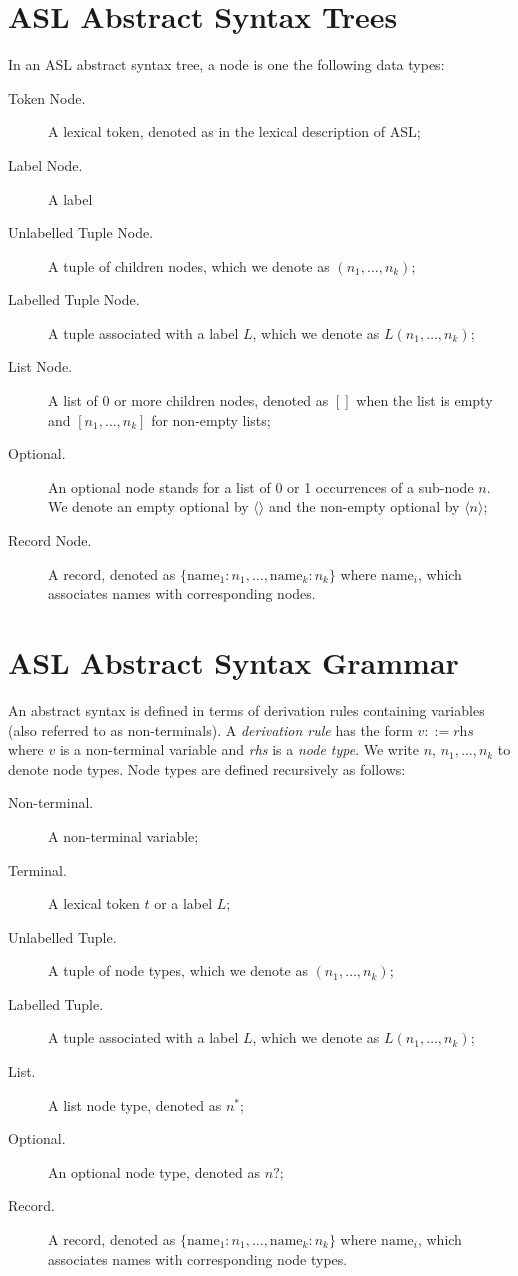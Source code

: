 \documentclass{book}
\begin{document}
\section{ASL Abstract Syntax Trees}

In an ASL abstract syntax tree, a node is one the following data types:
\begin{description}
\item[Token Node.] A lexical token, denoted as in the lexical description of ASL;
\item[Label Node.] A label
\item[Unlabelled Tuple Node.] A tuple of children nodes, which we denote as $(n_1,\ldots,n_k)$;
\item[Labelled Tuple Node.] A tuple associated with a label $L$, which we denote as $L(n_1,\ldots,n_k)$;
\item[List Node.] A list of 0 or more children nodes, denoted as $[ ]$ when the list is empty and $[n_1,\ldots,n_k]$ for non-empty lists;
\item[Optional.] An optional node stands for a list of 0 or 1 occurrences of a sub-node $n$. We denote an empty optional by $\langle\rangle$ and the non-empty optional by $\langle n \rangle$;
\item[Record Node.] A record, denoted as $\{\text{name}_1 : n_1,\ldots,\text{name}_k : n_k\}$ where $\text{name}_i$, which associates names with corresponding nodes.
\end{description}

\section{ASL Abstract Syntax Grammar}

An abstract syntax is defined in terms of derivation rules containing variables (also referred to as non-terminals).
%
A \emph{derivation rule} has the form $v ::= \textit{rhs}$ where $v$ is a non-terminal variable and \textit{rhs} is a \emph{node type}. We write $n$, $n_1,\ldots,n_k$ to denote node types.
%
Node types are defined recursively as follows:
\begin{description}
\item[Non-terminal.] A non-terminal variable;
\item[Terminal.] A lexical token $t$ or a label $L$;
\item[Unlabelled Tuple.] A tuple of node types, which we denote as $(n_1,\ldots,n_k)$;
\item[Labelled Tuple.] A tuple associated with a label $L$, which we denote as $L(n_1,\ldots,n_k)$;
\item[List.] A list node type, denoted as $n^{*}$;
\item[Optional.] An optional node type, denoted as $n?$;
\item[Record.] A record, denoted as $\{\text{name}_1 : n_1,\ldots,\text{name}_k : n_k\}$ where $\text{name}_i$, which associates names with corresponding node types.
\end{description}
\end{document}
